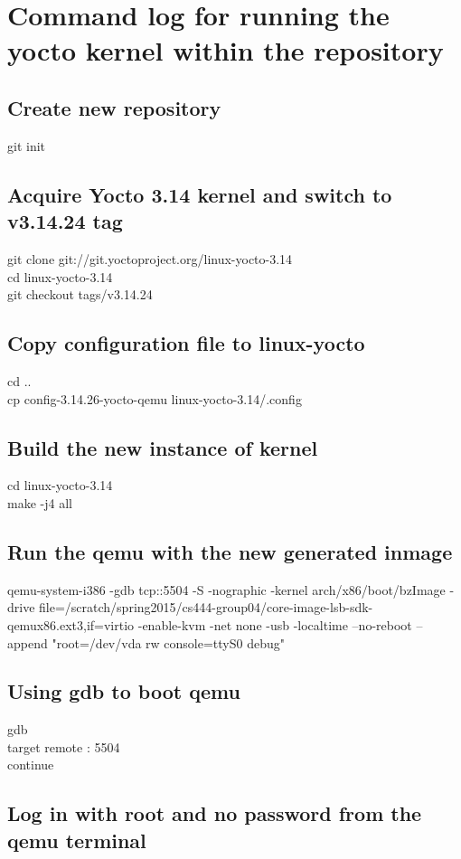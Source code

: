 \documentclass[letterpaper,10pt]{article}
\begin{document}
\section{Command log for running the yocto kernel within the repository}
\subsection{Create new repository}
git init
\subsection{Acquire Yocto 3.14 kernel and switch to v3.14.24 tag}
git clone git://git.yoctoproject.org/linux-yocto-3.14\\
cd linux-yocto-3.14\\
git checkout tags/v3.14.24\\
\subsection{Copy configuration file to linux-yocto}
cd ..\\
cp config-3.14.26-yocto-qemu linux-yocto-3.14/.config\\
\subsection{Build the new instance of kernel}
cd linux-yocto-3.14\\
make -j4 all\\
\subsection{Run the qemu with the new generated inmage}
qemu-system-i386 -gdb tcp::5504 -S -nographic -kernel arch/x86/boot/bzImage -drive file=/scratch/spring2015/cs444-group04/core-image-lsb-sdk-qemux86.ext3,if=virtio -enable-kvm -net none -usb -localtime --no-reboot --append "root=/dev/vda rw console=ttyS0 debug"
\subsection{Using gdb to boot qemu}
gdb\\
target remote : 5504\\
continue\\
\subsection{Log in with root and no password from the qemu terminal}
\end{document}

